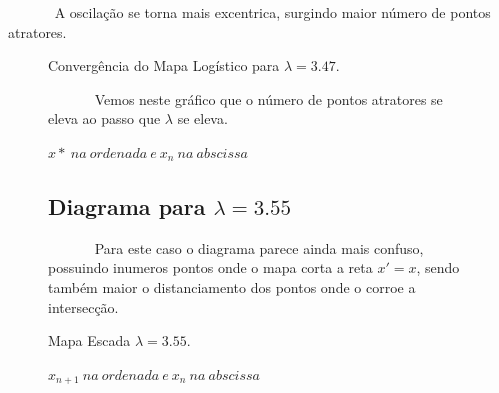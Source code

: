 \documentclass[pdftex,12pt,a4paper]{article}
\begin{document}
~~~~~~ A oscilação se torna mais excentrica, surgindo maior número de pontos atratores.
\begin{figure}
\centering
\caption{Convergência do Mapa Logístico para $\lambda = 3.47$.}
\caption*{$x*\ na\ ordenada\ e\ x_{n}\ na\ abscissa$ }
~~~~~~ Vemos neste gráfico que o número de pontos atratores se eleva ao passo que $\lambda$ se eleva.
\end{figure}

\begin{figure}
\subsection{Diagrama para $\lambda = 3.55$}
~~~~~~ Para este caso o diagrama parece ainda mais confuso, possuindo inumeros pontos onde o mapa corta a reta $x' = x$, sendo também maior o distanciamento dos pontos onde o corroe a intersecção.

\centering
\caption{Mapa Escada $\lambda = 3.55$.}
\caption*{$x_{n+1}\ na\ ordenada\ e\ x_{n}\ na\ abscissa$ }
\end{figure}
\end{document}
